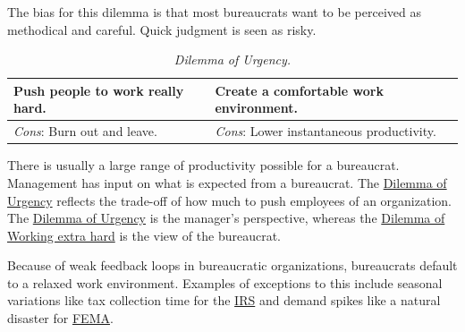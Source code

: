 The bias for this dilemma is that most bureaucrats want to be perceived as methodical and careful. Quick judgment is seen as risky. 


\begin{center}
\begin{table}[H] %
\begin{tabular}{ | m{\dilemmatablewidth}| m{\dilemmatablewidth} | } 
  \hline
  \textbf{Push people to work really hard.} & 
  \textbf{Create a comfortable work environment.} \\ 
  \hline
  \textit{Cons}: Burn out and leave. & 
  \textit{Cons}: Lower instantaneous productivity. \\  
  \hline
\end{tabular}
\caption{
\textit{Dilemma of Urgency.}
}
\label{table:dilemma-personal-manager-rate-of-work}
\end{table}
\end{center}

There is usually a large range of productivity possible for a bureaucrat. Management has input on what is expected from 
 a bureaucrat. The 
\hyperref[table:dilemma-personal-manager-rate-of-work]{Dilemma of Urgency} reflects the trade-off of how much to push employees of an organization. The \hyperref[table:dilemma-personal-manager-rate-of-work]{Dilemma of Urgency} is the manager's perspective, whereas the
\hyperref[table:dilemma-personal-work-extra-or-work-as-expected]{Dilemma of Working extra hard}
is the view of the bureaucrat. 


Because of weak feedback loops in bureaucratic organizations, bureaucrats default to a relaxed work environment. Examples of exceptions to this include seasonal variations like tax collection time for the \href{https://en.wikipedia.org/wiki/Internal_Revenue_Service}{IRS} 
and demand spikes like a natural disaster for \href{https://en.wikipedia.org/wiki/Federal_Emergency_Management_Agency}{FEMA}. 

